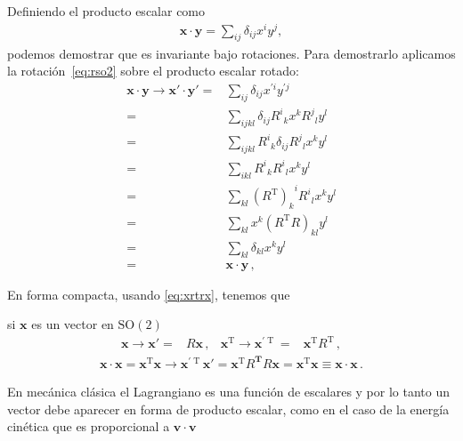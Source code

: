 Definiendo el producto escalar como
\begin{align}
  \boldsymbol{x}\cdot \boldsymbol{y}=\sum_{ij}\delta_{ij} x^i y^j,
\end{align}
podemos demostrar que es invariante bajo rotaciones. Para demostrarlo aplicamos la rotación~\eqref{eq:rso2} sobre el producto escalar rotado:
\begin{align}
  \boldsymbol{x}\cdot \boldsymbol{y}\to  \boldsymbol{x}'\cdot \boldsymbol{y}'
                     =&\sum_{ij} \delta_{ij} x^{\prime i}  y^{\prime j} \nonumber\\
                     =&\sum_{ijkl}\delta_{ij} {R^i}_k x^{k}  {R^j}_l y^{l} \nonumber\\
                     =&\sum_{ijkl} {R^i}_k \delta_{ij} {R^j}_l  x^{k}  y^{l} \nonumber\\
  =&\sum_{ikl} {R^i}_k  {R^i}_l  x^{k}  y^{l} \nonumber\\
  \label{eq:xrtrx}
                     =&\sum_{kl}  {\left( R^{\text{T}} \right)_k}^i  {R^i}_l  x^{k}  y^{l} \\
  =&\sum_{kl} x^{k}  \left( R^{\text{T}}R \right)_{kl}      y^{l} \nonumber\\
  =&\sum_{kl}  \delta_{kl}    x^{k}  y^{l} \nonumber\\
    =& \boldsymbol{x}\cdot \boldsymbol{y}\,,
\end{align}

En forma compacta, usando \eqref{eq:xrtrx}, tenemos que
\begin{frame}
  si $\boldsymbol{x}$ es un vector en $\operatorname{SO(2)}$
\begin{align}
  \boldsymbol{x}\to \boldsymbol{x}'=&R \boldsymbol{x}\,,&
  \boldsymbol{x}^{\operatorname{T}}\to \boldsymbol{x}^{\prime {\operatorname{T}}}=& \boldsymbol{x}^{\operatorname{T}} R^{\operatorname{T}}\,,
\end{align}
\begin{align}
  \label{eq:psso2}
  \boldsymbol{x}\cdot \boldsymbol{x}= \boldsymbol{x}^{\operatorname{T}} \boldsymbol{x}\to \boldsymbol{x}^{\prime\operatorname{T}} \boldsymbol{x}'
  =\boldsymbol{x}^{\operatorname{T}}R^{\boldsymbol{T}} R \boldsymbol{x}=\boldsymbol{x}^{\operatorname{T}} \boldsymbol{x}\equiv  \boldsymbol{x}\cdot \boldsymbol{x}\,.
\end{align}

\end{frame}

\begin{frame}
  En mecánica clásica el Lagrangiano es una función de escalares y por lo tanto un vector debe aparecer en forma de producto escalar, como en el caso de la energía cinética que es proporcional a $\boldsymbol{v}\cdot \boldsymbol{v}$
\end{frame}

